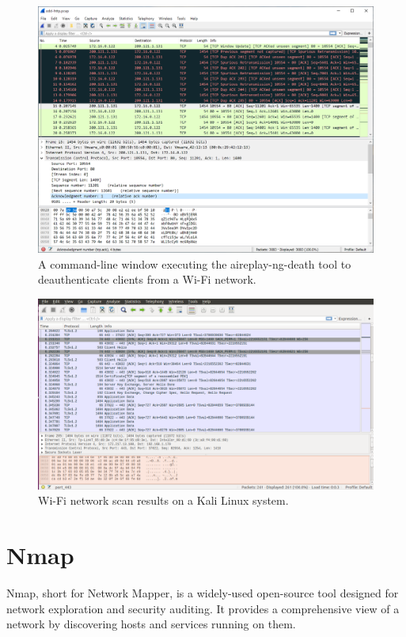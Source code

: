 \documentclass[11pt]{article}
\begin{document}
\begin{figure}[H]
	\centering
	\includegraphics[width=.95\textwidth]{img/wireshark/wireshark_8.jpg}
	\caption{A command-line window executing the aireplay-ng-death tool to deauthenticate clients from a Wi-Fi network. }
\end{figure}

\begin{figure}[H]
	\centering
	\includegraphics[width=.95\textwidth]{img/wireshark/wireshark_9.jpg}
	\caption{Wi-Fi network scan results on a Kali Linux system.	}
\end{figure}

\section{Nmap}
Nmap, short for Network Mapper, is a widely-used open-source tool designed for network exploration and security auditing. It provides a comprehensive view of a network by discovering hosts and services running on them.
\end{document}
